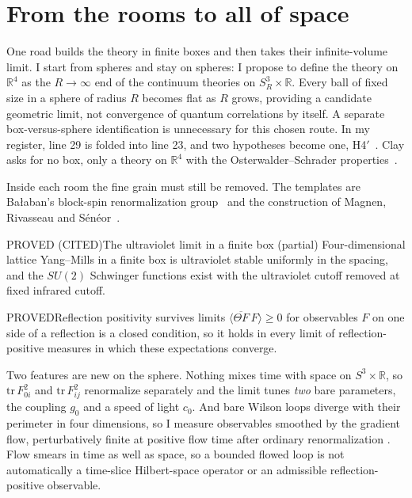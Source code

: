 \section{From the rooms to all of space}

One road builds the theory in finite boxes and then takes their infinite-volume limit. I start from spheres and stay on spheres: I propose to define the theory on $\mathbb R^4$ as
the $R\to\infty$ end of the continuum theories on $S^3_R\times\mathbb R$. Every ball of fixed size in a sphere of radius
$R$ becomes flat as $R$ grows, providing a candidate geometric limit, not convergence of quantum correlations by itself.
A separate box-versus-sphere identification is unnecessary for this chosen route. In my register, line 29 is folded into line 23,
and two hypotheses become one, H4$'$~\cite{ClosedSet}. Clay asks for no box, only a theory on $\mathbb R^4$ with the
Osterwalder--Schrader properties~\cite{JaffeWitten}.

Inside each room the fine grain must still be removed. The templates are Ba{\l}aban's block-spin renormalization
group~\cite{Balaban} and the construction of Magnen, Rivasseau and S\'en\'eor~\cite{MRS93}.

\begin{claim}{PROVED (CITED)}{The ultraviolet limit in a finite box (partial)}\label{b:box}
Four-dimensional lattice Yang--Mills in a finite box is ultraviolet stable uniformly in the spacing, and the $SU(2)$
Schwinger functions exist with the ultraviolet cutoff removed at fixed infrared cutoff.
\end{claim}

\begin{claim}{PROVED}{Reflection positivity survives limits}\label{b:rplimit}
$\langle\overline{\Theta F}\,F\rangle\ge0$ for observables $F$ on one side of a reflection is a closed condition, so it
holds in every limit of reflection-positive measures in which these expectations converge.
\end{claim}

Two features are new on the sphere. Nothing mixes time with space on $S^3\times\mathbb R$, so $\mathrm{tr}\,F_{0i}^2$
and $\mathrm{tr}\,F_{ij}^2$ renormalize separately and the limit tunes \emph{two} bare parameters, the coupling $g_0$ and a
speed of light $c_0$. And bare Wilson loops diverge with their perimeter in four dimensions, so I measure observables
smoothed by the gradient flow, perturbatively finite at positive flow time after ordinary renormalization
\cite{Luscher10,LuscherWeisz11}. Flow smears in time as well as space, so a bounded flowed loop is not automatically
a time-slice Hilbert-space operator or an admissible reflection-positive observable.

